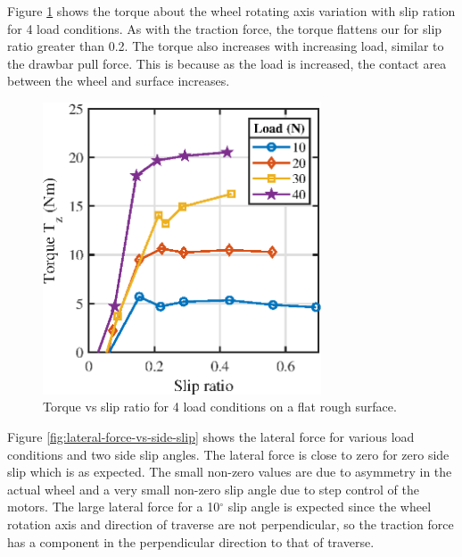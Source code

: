 \documentclass{article}
\begin{document}
Figure \ref{fig:torque-vs-slip-ratio-flat} shows the torque about the wheel rotating axis variation with slip ration for 4 load conditions. As with the traction force, the torque flattens our for slip ratio greater than 0.2. The torque also increases with increasing load, similar to the drawbar pull force. This is because as the load is increased, the contact area between the wheel and surface increases. 

\begin{figure}[hbt!]
\centering
\includegraphics[width=3.25in]{plots/torque-vs-slip-ratio-flat.eps}
\caption{Torque vs slip ratio for 4 load conditions on a flat rough surface.}
\label{fig:torque-vs-slip-ratio-flat}
\end{figure}

Figure \ref{fig:lateral-force-vs-side-slip} shows the lateral force for various load conditions and two side slip angles. The lateral force is close to zero for zero side slip which is as expected. The small non-zero values are due to asymmetry in the actual wheel and a very small non-zero slip angle due to step control of the motors. The large lateral force for a 10$^\circ$ slip angle is expected since the wheel rotation axis and direction of traverse are not perpendicular, so the traction force has a component in the perpendicular direction to that of traverse.  
\end{document}
